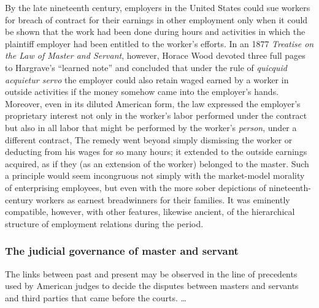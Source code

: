 \documentclass[
  letterpaper,
  11pt,
  DIV=9,
  openright]{scrbook}
\begin{document}
By the late nineteenth century, employers in the United States could sue
workers for breach of contract for their earnings in other employment
only when it could be shown that the work had been done during hours and
activities in which the plaintiff employer had been entitled to the
worker's efforts. In an 1877 \emph{Treatise on the Law of Master and
Servant}, however, Horace Wood devoted three full pages to Hargrave's
``learned note'' and concluded that under the rule of \emph{quicquid
acquietur servo} the employer could also retain waged earned by a worker
in outside activities if the money somehow came into the employer's
hands.{} Moreover, even in its diluted
American form, the law expressed the employer's proprietary interest not
only in the worker's labor performed under the contract but also in all
labor that might be performed by the worker's \emph{person}, under a
different contract, The remedy went beyond simply dismissing the worker
or deducting from his wages for so many hours; it extended to the
outside earnings acquired, as if they (as an extension of the worker)
belonged to the master. Such a principle would seem incongruous not
simply with the market-model morality of enterprising employees, but
even with the more sober depictions of nineteenth-century workers as
earnest breadwinners for their families. It was eminently compatible,
however, with other features, likewise ancient, of the hierarchical
structure of employment relations during the period.

\subsubsection{The judicial governance of master and
servant}\label{the-judicial-governance-of-master-and-servant}

The links between past and present may be observed in the line of
precedents used by American judges to decide the disputes between
masters and servants and third parties that came before the courts.
\ldots{}

\end{document}
